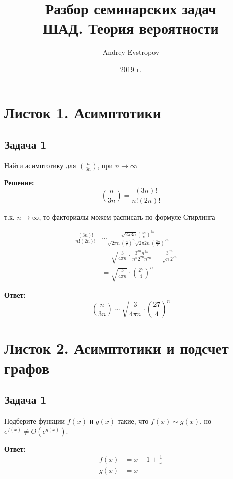 \documentclass[a4paper, 11pt]{article}
\author{Andrey Evstropov}
\title{
	Разбор семинарских задач \\
	\large ШАД. Теория вероятности
}
\date{2019 г.}
\begin{document}
\maketitle

\section{Листок 1. Асимптотики}

\subsection{Задача 1}

Найти асимптотику для $\binom{n}{3n}$, при $n \rightarrow \infty$

\textbf{Решение:}
\[
\binom{n}{3n}=\frac{(3n)!}{n!(2n)!}
\]

т.к. $n \to \infty$, то факториалы можем расписать по формуле Стирлинга

\begin{equation*}
\begin{aligned}
\frac{(3n)!}{n!(2n)!}&\sim \frac{
	\sqrt{2\pi3n}{\left(\frac{3n}{e}\right)^{3n}}
}{
	\sqrt{2\pi n}{\left(\frac{n}{e}\right)^{n}}
	\sqrt{2\pi 2n}{\left(\frac{2n}{e}\right)^{2n}}
}=
\\
&= \sqrt{\frac{3}{4\pi n}} \cdot \frac{
	3^{3n}n^{3n}
}{
	n^n 2^{2n}n^{2n}
}  = \frac{
	3^{3n}
}{
	\sqrt{n}2^{2n}
} =
\\
& = \sqrt{\frac{3}{4\pi n}} \cdot \left(\frac{27}{4}\right)^n
\end{aligned}
\end{equation*}

\textbf{Ответ:}
\[
\binom{n}{3n}\sim \sqrt{\frac{3}{4\pi n}} \cdot \left(\frac{27}{4}\right)^n
\]


\section{Листок 2. Асимптотики и подсчет графов}

\subsection{Задача 1}
Подберите функции $f(x)$ и $g(x)$ такие, что $f(x)\sim g(x)$, 
но $e^{f(x)} \neq O(e^{g(x)})$.

\textbf{Ответ:}
\begin{equation*}
\begin{aligned}
f(x)&=x + 1+\frac{1}{x} \\
g(x)&=x
\end{aligned}
\end{equation*}
\end{document}
